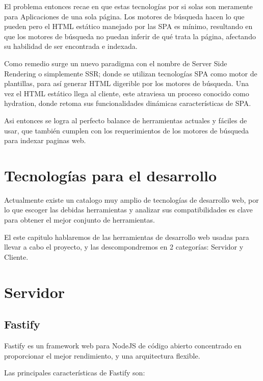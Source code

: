 El problema entonces recae en que estas tecnologías por si solas son meramente para Aplicaciones de una sola página. Los motores de búsqueda hacen lo que pueden pero el HTML estático manejado por las SPA es mínimo, resultando en que los motores de búsqueda no puedan inferir de qué trata la página, afectando su habilidad de ser encontrada e indexada.

Como remedio surge un nuevo paradigma con el nombre de Server Side Rendering o simplemente SSR; donde se utilizan  tecnologías SPA como motor de plantillas, para así generar HTML digerible por los motores de búsqueda. Una vez el HTML estático llega al cliente, este atraviesa un proceso conocido como hydration, donde retoma sus funcionalidades dinámicas características de SPA.

Asi entonces se logra al perfecto balance de herramientas actuales y fáciles de usar, que también cumplen con los requerimientos de los motores de búsqueda para indexar paginas web.

\section{Tecnologías para el desarrollo}

Actualmente existe un catalogo muy amplio de tecnologías de desarrollo web, por lo que escoger las debidas herramientas y analizar sus compatibilidades es clave para obtener el mejor conjunto de herramientas.

El este capitulo hablaremos de las herramientas de desarrollo web usadas para llevar a cabo el proyecto, y las descompondremos en 2 categorías: Servidor y Cliente.

\section{Servidor}

\subsection{Fastify}

Fastify es un framework web para NodeJS de código abierto concentrado en proporcionar el mejor rendimiento, y una arquitectura flexible. 

Las principales características de Fastify son:

